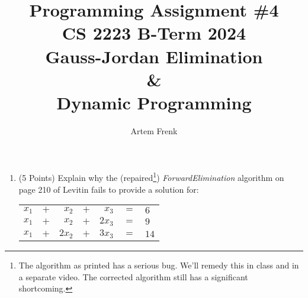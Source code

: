 \documentclass[12pt]{amsart}
\title{Programming Assignment \#4\\CS 2223 B-Term 2024\\Gauss-Jordan Elimination\\ \& \\ Dynamic Programming}
\author{Artem Frenk}
\date{} %
\begin{document}
\pagestyle{empty}
\maketitle

\begin{enumerate}[1.]

\item (5 Points) Explain why the (repaired\footnote{The algorithm as printed has a serious bug.  We'll remedy this in class and in a separate video.  The corrected algorithm still has a significant shortcoming.}) \textit{ForwardElimination} algorithm on page 210 of Levitin fails to provide a solution for:\\

\begin{center}

\begin{tabular}{r c r c r c l}

$x_1$&$+$&$x_2$&$+$&$x_3$&$=$&$6$\\

$x_1$&$+$&$x_2$&$+$&$2x_3$&$=$&$9$\\

$x_1$&$+$&$2x_2$&$+$&$3x_3$&$=$&$14$\\


\end{tabular}

\end{center}

\vspace{.2 in}


\end{enumerate}
\end{document}
